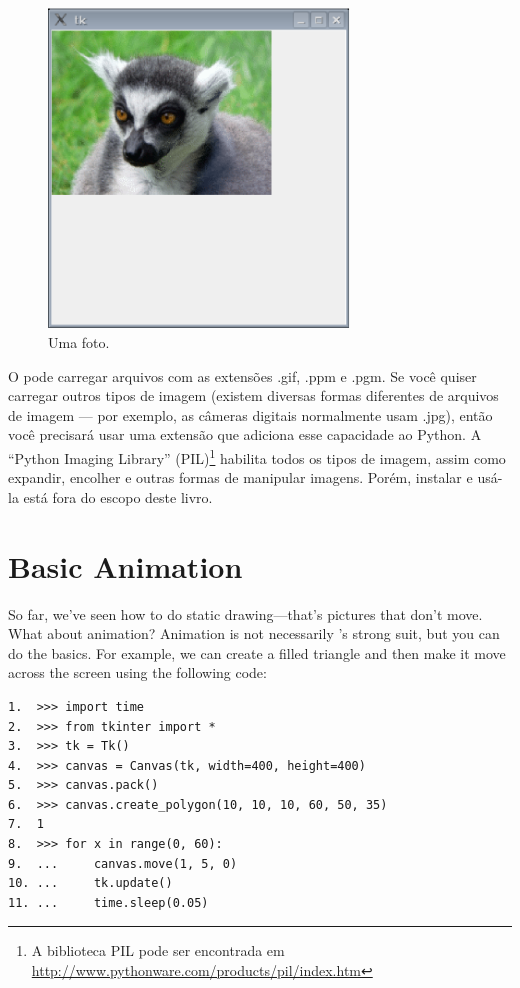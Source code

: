 \begin{figure}
\begin{center}
\includegraphics[width=80mm]{eps/figure43.eps}
\end{center}
\caption{Uma foto.}\label{fig43}
\end{figure}

O  pode carregar arquivos com as extensões .gif, .ppm e .pgm. Se você quiser carregar outros tipos de imagem (existem diversas formas diferentes de arquivos de imagem --- por exemplo, as câmeras digitais normalmente usam .jpg), então você precisará usar uma extensão que adiciona esse capacidade ao Python. A ``Python Imaging Library'' (PIL)\footnote{A biblioteca PIL pode ser encontrada em \href{http://www.pythonware.com/products/pil/index.htm}{http://www.pythonware.com/products/pil/index.htm}} habilita todos os tipos de imagem, assim como expandir, encolher e outras formas de manipular imagens. Porém, instalar e usá-la está fora do escopo deste livro.

\section{Basic Animation}

So far, we've seen how to do static drawing---that's pictures that don't move. What about animation? Animation is not necessarily 's strong suit, but you can do the basics. For example, we can create a filled triangle and then make it move across the screen using the following code:

\begin{listingignore}
\begin{verbatim}
1.  >>> import time
2.  >>> from tkinter import *
3.  >>> tk = Tk()
4.  >>> canvas = Canvas(tk, width=400, height=400)
5.  >>> canvas.pack()
6.  >>> canvas.create_polygon(10, 10, 10, 60, 50, 35)
7.  1
8.  >>> for x in range(0, 60):
9.  ...     canvas.move(1, 5, 0)
10. ...     tk.update()
11. ...     time.sleep(0.05)
\end{verbatim}
\end{listingignore}

